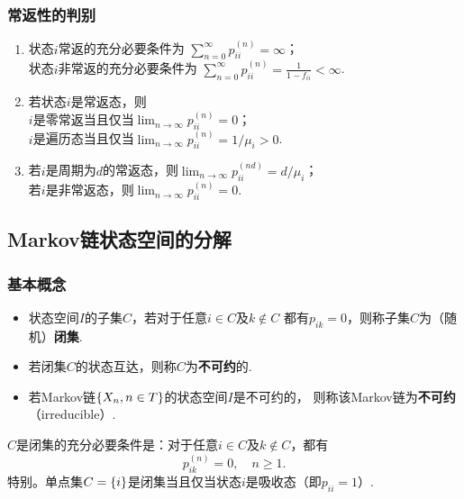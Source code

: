 \begin{frame}
    \frametitle{常返性的判别}
    \begin{mytheorem}[常返性的判别]
        \begin{enumerate}
            \item <1->状态$i$常返的充分必要条件为
            $\displaystyle\sum_{n=0}^\infty p_{ii}^{(n)}=\infty$；\\
            状态$i$非常返的充分必要条件为
            $\displaystyle\sum_{n=0}^\infty p_{ii}^{(n)}=\frac{1}{1-f_{ii}}<\infty$.
            \item <1->若状态$i$是常返态，则\\
                $i$是零常返当且仅当$\displaystyle\lim_{n\to\infty}p_{ii}^{(n)}=0$；\\
                $i$是遍历态当且仅当$\displaystyle\lim_{n\to\infty}p_{ii}^{(n)}=1/\mu_i>0$.
            \item <1->若$i$是周期为$d$的常返态，则$\displaystyle\lim_{n\to\infty}p_{ii}^{(nd)}=d/\mu_i$；\\
                若$i$是非常返态，则$\displaystyle\lim_{n\to\infty}p_{ii}^{(n)}=0$.
        \end{enumerate}
    \end{mytheorem}
\end{frame}

\subsection{Markov链状态空间的分解}

\begin{frame}
    \frametitle{基本概念}
    \begin{mydefinition}
        \begin{itemize}
            \item 状态空间$I$的子集$C$，若对于任意$i\in C$及$k\notin C$
            都有$p_{ik}=0$，则称子集$C$为（随机）\textbf{闭集}. 
            \item 若闭集$C$的状态互达，则称$C$为\textbf{不可约}的. 
            \item 若Markov链$\left\{X_n,n\in T\right\}$的状态空间$I$是不可约的，
            则称该Markov链为\textbf{不可约}（irreducible）.
        \end{itemize}
    \end{mydefinition}
    \begin{mytheorem}
        $C$是闭集的充分必要条件是：对于任意$i\in C$及$k\notin C$，都有
        \begin{equation*}
            p_{ik}^{(n)}=0,\quad n\geqslant 1.
        \end{equation*}
        特别。单点集$C=\left\{i\right\}$是闭集当且仅当状态$i$是吸收态（即$p_{ii}=1$）.
    \end{mytheorem}
\end{frame}

